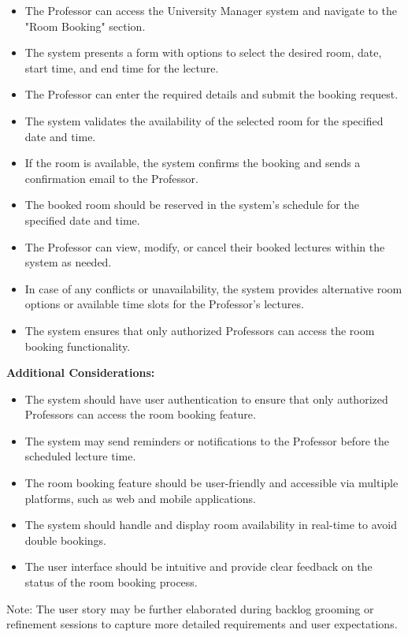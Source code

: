 \documentclass[conference,onecolumn]{IEEEtran}
\begin{document}
\begin{framed}
	\begin{itemize}
		\item The Professor can access the University Manager system and navigate to the "Room Booking" section.
		\item The system presents a form with options to select the desired room, date, start time, and end time for the lecture.
		\item The Professor can enter the required details and submit the booking request.
		\item The system validates the availability of the selected room for the specified date and time.
		\item If the room is available, the system confirms the booking and sends a confirmation email to the Professor.
		\item The booked room should be reserved in the system's schedule for the specified date and time.
		\item The Professor can view, modify, or cancel their booked lectures within the system as needed.
		\item In case of any conflicts or unavailability, the system provides alternative room options or available time slots for the Professor's lectures.
		\item The system ensures that only authorized Professors can access the room booking functionality.
	\end{itemize}
	
	\textbf{Additional Considerations:}
	
	\begin{itemize}
		\item The system should have user authentication to ensure that only authorized Professors can access the room booking feature.
		\item The system may send reminders or notifications to the Professor before the scheduled lecture time.
		\item The room booking feature should be user-friendly and accessible via multiple platforms, such as web and mobile applications.
		\item The system should handle and display room availability in real-time to avoid double bookings.
		\item The user interface should be intuitive and provide clear feedback on the status of the room booking process.
	\end{itemize}
	
	Note: The user story may be further elaborated during backlog grooming or refinement sessions to capture more detailed requirements and user expectations.
\end{framed}
\end{document}
